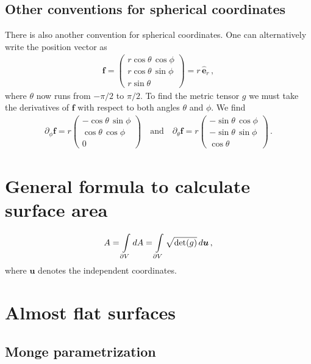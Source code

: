 \documentclass[11pt, DINA4, fleqn]{amsart}
\begin{document}
\subsection{Other conventions for spherical coordinates}
There is also another convention for spherical coordinates.
One can alternatively write the position vector as
\begin{align}
	\boldsymbol{f} = \begin{pmatrix}
		r \cos\theta \, \cos\phi \\
		r \cos\theta \, \sin\phi \\
		r \sin\theta
	\end{pmatrix} = r\, \hat{\boldsymbol{e}}_r \, ,
\end{align}
where $\theta$ now runs from $-\pi/2$ to $\pi/2$.
To find the metric tensor $g$ we must take the derivatives of $\boldsymbol{f}$ with respect to both angles $\theta$ and $\phi$.
We find
\begin{align}
\partial_{\phi}\boldsymbol{f} = r \begin{pmatrix}
-\cos\theta\, \sin\phi \\
\cos\theta\, \cos\phi \\
0
\end{pmatrix}
\quad \text{and} \quad
\partial_{\theta}\boldsymbol{f} = r \begin{pmatrix}
-\sin\theta\, \cos\phi \\
-\sin\theta\, \sin\phi \\
\cos\theta
\end{pmatrix}
\, .
\end{align}

\section{General formula to calculate surface area}
\begin{align}
A = \int\displaylimits_{\partial V} dA = \int\displaylimits_{\partial V}\sqrt{\text{det}(g)} \, d\boldsymbol{u} \, ,
\end{align}
where $\boldsymbol{u}$ denotes the independent coordinates.



\section{Almost flat surfaces}

\subsection{Monge parametrization}
\end{document}

